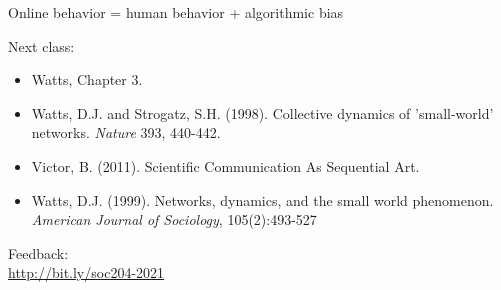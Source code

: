 \documentclass[aspectratio=169]{beamer}
\begin{document}
\begin{frame}

Online behavior = human behavior + algorithmic bias


\end{frame}
\begin{frame}

Next class:\\
\pause
\begin{itemize}
\item Watts, Chapter 3.
\item Watts, D.J. and Strogatz, S.H. (1998). Collective dynamics of 'small-world' networks. \textit{Nature} 393, 440-442.
\item Victor, B. (2011). Scientific Communication As Sequential Art.
\item Watts, D.J. (1999). Networks, dynamics, and the small world phenomenon. \textit{American Journal of Sociology}, 105(2):493-527
\end{itemize}

\end{frame}
\begin{frame}

Feedback:\\
\Large{\url{http://bit.ly/soc204-2021}}

\end{frame}
\end{document}
